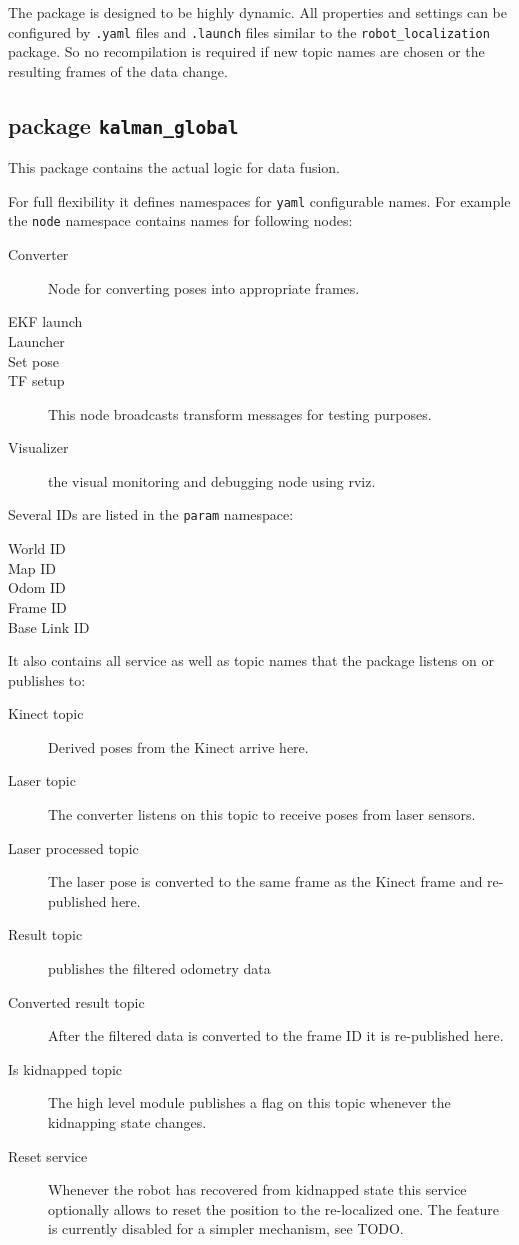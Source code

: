 The package is designed to be highly dynamic. All properties and settings can be configured by \texttt{.yaml} files and \texttt{.launch} files similar to the \texttt{robot\_localization} package. So no recompilation is required if new topic names are chosen or the resulting frames of the data change.

\subsection{package \texttt{kalman\_global}}
This package contains the actual logic for data fusion.

For full flexibility it defines namespaces for \texttt{yaml} configurable names. For example the \texttt{node} namespace contains names for following nodes:
\begin{description}
\item[Converter] Node for converting poses into appropriate frames.
\item[EKF launch] 
\item[Launcher]
\item[Set pose]
\item[TF setup] This node broadcasts transform messages for testing purposes.
\item[Visualizer] the visual monitoring and debugging node using rviz.
\end{description}

Several IDs are listed in the \texttt{param} namespace:
\begin{description}
\item[World ID]
\item[Map ID]
\item[Odom ID]
\item[Frame ID]
\item[Base Link ID]
\end{description}

It also contains all service as well as topic names that the package listens on or publishes to:

\begin{description}
\item[Kinect topic] Derived poses from the Kinect arrive here.
\item[Laser topic] The converter listens on this topic to receive poses from laser sensors. 
\item[Laser processed topic] The laser pose is converted to the same frame as the Kinect frame and re-published here.
\item[Result topic] publishes the filtered odometry data
\item[Converted result topic] After the filtered data is converted to the frame ID it is re-published here.
\item[Is kidnapped topic] The high level module publishes a flag on this topic whenever the kidnapping state changes.
\item[Reset service] Whenever the robot has recovered from kidnapped state this service optionally allows to reset the position to the re-localized one. The feature is currently disabled for a simpler mechanism, see TODO.
\end{description}

